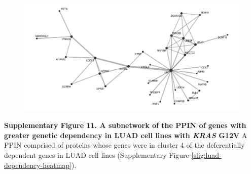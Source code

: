\documentclass[english, 10pt, letterpaper]{article}
\newcommand{\KRAS}{\emph{KRAS}}
\begin{document}
\begin{figure}[h!]
\centering
\includegraphics[width=180mm]{figures/Supp_Fig_11.jpeg}
\label{sfig:luad-dependency-subppin}
\end{figure}

\noindent \textbf{Supplementary Figure 11. A subnetwork of the PPIN of genes with greater genetic dependency in LUAD cell lines with \KRAS{} G12V}
A PPIN comprised of proteins whose genes were in cluster 4 of the deferentially dependent genes in LUAD cell lines (Supplementary Figure \ref{sfig:luad-dependency-heatmap}).
\newpage
\end{document}
